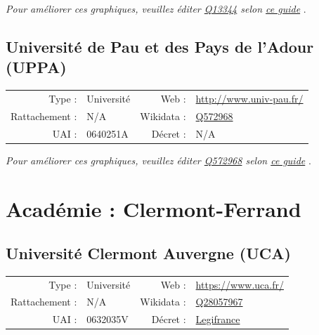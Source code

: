 \documentclass[11pt,french,landscape]{article}
\begin{document}
\textit{\scriptsize Pour améliorer ces graphiques, veuillez éditer \href{https://www.wikidata.org/entity/Q13344}{Q13344}  selon \href{https://github.com/cpesr/wikidataESR/blob/master/Rmd/wikidataESR.md}{ce guide}}
.


\newpage

\hypertarget{universituxe9-de-pau-et-des-pays-de-ladour-uppa}{%
\subsection{Université de Pau et des Pays de l'Adour
(UPPA)}\label{universituxe9-de-pau-et-des-pays-de-ladour-uppa}}

\begin{tabular*}{0.45\textwidth}{rp{2cm}rl}  
\hline  
Type : & Université & Web : &\href{http://www.univ-pau.fr/}{http://www.univ-pau.fr/} \\  
Rattachement : & N/A & Wikidata : & \href{https://www.wikidata.org/entity/Q572968}{Q572968} \\  
UAI : & 0640251A & Décret : & N/A \\  
\hline  
\end{tabular*}

\textit{\scriptsize Pour améliorer ces graphiques, veuillez éditer \href{https://www.wikidata.org/entity/Q572968}{Q572968}  selon \href{https://github.com/cpesr/wikidataESR/blob/master/Rmd/wikidataESR.md}{ce guide}}
.


\newpage

\hypertarget{acaduxe9mie-clermont-ferrand}{%
\section{Académie :
Clermont-Ferrand}\label{acaduxe9mie-clermont-ferrand}}

\hypertarget{universituxe9-clermont-auvergne-uca}{%
\subsection{Université Clermont Auvergne
(UCA)}\label{universituxe9-clermont-auvergne-uca}}

\begin{tabular*}{0.45\textwidth}{rp{2cm}rl}  
\hline  
Type : & Université & Web : &\href{https://www.uca.fr/}{https://www.uca.fr/} \\  
Rattachement : & N/A & Wikidata : & \href{https://www.wikidata.org/entity/Q28057967}{Q28057967} \\  
UAI : & 0632035V & Décret : & \href{https://www.legifrance.gouv.fr/affichTexte.do?cidTexte=JORFTEXT000033119145&categorieLien=id}{Legifrance} \\  
\hline  
\end{tabular*}
\end{document}
